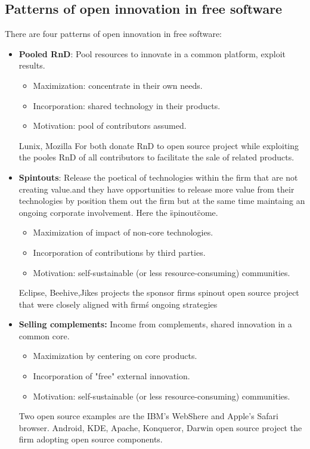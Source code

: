 \subsection{Patterns of open innovation in free software} \label{Patterns of open innovation in free software}
There are four patterns of open innovation in free software:
\begin{itemize}
 \item  \textbf {Pooled RnD}: Pool resources to innovate in a common platform, exploit results.
 \begin{itemize}
		\item Maximization: concentrate in their own needs.
		\item Incorporation: shared technology in their products.
		\item Motivation: pool of contributors assumed.
	\end{itemize}
Lunix, Mozilla For both donate RnD to open source project while exploiting the pooles RnD of all contributors to facilitate the sale of related products.


 \item  \textbf {Spintouts}: Release the poetical of technologies within the firm that are not creating value.and they have opportunities to release more value from their technologies by position them out the firm but at the same time maintaing an ongoing corporate involvement. Here the \"spinout\"come.
	\begin{itemize}
		\item Maximization of impact of non-core technologies.
		\item Incorporation of contributions by third parties.
		\item Motivation: self-sustainable (or less resource-consuming) communities.
	\end{itemize}
Eclipse, Beehive,Jikes projects the sponsor firms spinout open source project that were closely aligned with firm\'s ongoing strategies

 \item \textbf{Selling complements:} Income from complements, shared innovation in a common core.
	\begin{itemize}
		\item Maximization by centering on core products.
		\item Incorporation of "free" external innovation.
		\item Motivation: self-sustainable (or less resource-consuming) communities.
	\end{itemize}
Two open source examples are the IBM's WebShere and Apple's Safari browser.
Android, KDE, Apache, Konqueror, Darwin open source project the firm adopting open source components.


\end{itemize}
